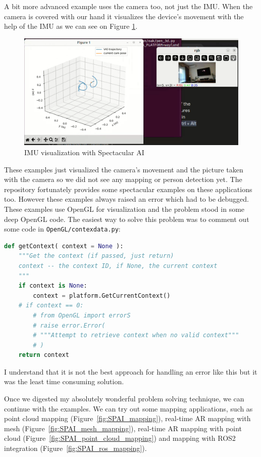 A bit more advanced example uses the camera too, not just the IMU. When the camera is covered with our hand it visualizes the device's movement with the help of the IMU as we can see on Figure \ref{fig:3d_pen}.

\begin{figure}[htbp]
	\centering
	\includegraphics[width=150mm, keepaspectratio]{figures/3d_pen.png}
	\caption{IMU visualization with Spectacular AI}
	\label{fig:3d_pen}
\end{figure}

These examples just visualized the camera's movement and the picture taken with the camera so we did not see any mapping or person detection yet. The repository fortunately provides some spectacular examples on these applications too. However these examples always raised an error which had to be debugged. These examples use OpenGL for visualization and the problem stood in some deep OpenGL code. The easiest way to solve this problem was to comment out some code in \verb|OpenGL/contexdata.py|:

\begin{lstlisting}[language=python,frame=single,float=!ht]
def getContext( context = None ):
    """Get the context (if passed, just return)
    context -- the context ID, if None, the current context
    """
    if context is None:
        context = platform.GetCurrentContext()
    # if context == 0:
        # from OpenGL import errorS
        # raise error.Error(
        # """Attempt to retrieve context when no valid context"""
        # )
    return context
\end{lstlisting}
\FloatBarrier

I understand that it is not the best approach for handling an error like this but it was the least time consuming solution.

Once we digested my absolutely wonderful problem solving technique, we can continue with the examples. We can try out some mapping applications, such as point cloud mapping (Figure~\ref{fig:SPAI_mapping}), real-time AR mapping with mesh (Figure~\ref{fig:SPAI_mesh_mapping}), real-time AR mapping with point cloud (Figure~\ref{fig:SPAI_point_cloud_mapping}) and mapping with ROS2 integration (Figure~\ref{fig:SPAI_ros_mapping}).

